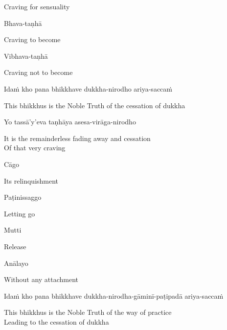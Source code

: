 \begin{english}
  Craving for sensuality
\end{english}

Bhava-taṇhā

\begin{english}
  Craving to become
\end{english}

Vibhava-taṇhā

\begin{english}
  Craving not to become
\end{english}

Idaṁ kho pana bhikkhave dukkha-nirodho ariya-saccaṁ

\begin{english}
  This bhikkhus is the Noble Truth of the cessation of dukkha
\end{english}

Yo tassā'y'eva taṇhāya asesa-virāga-nirodho

\begin{english}
  It is the remainderless fading away and cessation\\
  Of that very craving
\end{english}

Cāgo

\begin{english}
  Its relinquishment
\end{english}

Paṭinissaggo

\begin{english}
  Letting go
\end{english}

Mutti

\begin{english}
  Release
\end{english}

Anālayo

\begin{english}
  Without any attachment
\end{english}

\begin{pali-hang}
  Idaṁ kho pana bhikkhave dukkha-nirodha-gāminī-paṭipadā ariya-saccaṁ
\end{pali-hang}

\begin{english}
  This bhikkhus is the Noble Truth of the way of practice\\
  Leading to the cessation of dukkha
\end{english}


